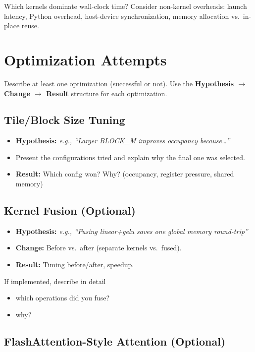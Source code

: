 \documentclass{article} %
\begin{document}
Which kernels dominate wall-clock time? Consider non-kernel overheads: launch latency, Python overhead, host-device synchronization, memory allocation vs.\ in-place reuse.

\section{Optimization Attempts}\label{sec:optimization}

Describe at least one optimization (successful or not). Use the \textbf{Hypothesis $\to$ Change $\to$ Result} structure for each optimization.

\subsection{Tile/Block Size Tuning}

\begin{itemize}
    \item \textbf{Hypothesis:} \textit{e.g., ``Larger BLOCK\_M improves occupancy because\ldots''}
    \item Present the configurations tried and explain why the final one was selected.
    \item \textbf{Result:} Which config won? Why? (occupancy, register pressure, shared memory)
\end{itemize}

\subsection{Kernel Fusion (Optional)}

\begin{itemize}
    \item \textbf{Hypothesis:} \textit{e.g., ``Fusing linear+gelu saves one global memory round-trip''}
    \item \textbf{Change:} Before vs.\ after (separate kernels vs.\ fused).
    \item \textbf{Result:} Timing before/after, speedup.
\end{itemize}

If implemented, describe in detail 
\begin{itemize}
    \item which operations did you fuse?
    \item why? 
\end{itemize}


\subsection{FlashAttention-Style Attention (Optional)}
\end{document}
